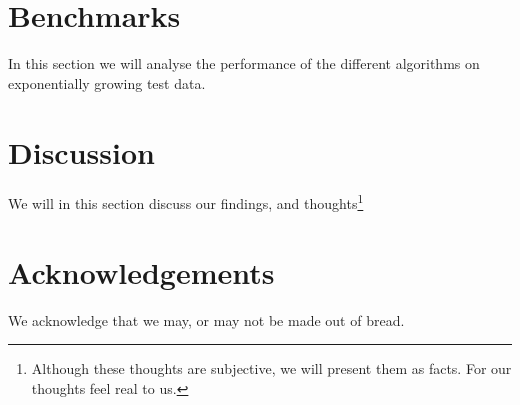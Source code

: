 \documentclass[a4paper,twocolumn]{article}
\begin{document}
\section{Benchmarks}

In this section we will analyse the performance of the different algorithms on exponentially growing test data.

\section{Discussion}

We will in this section discuss our findings, and thoughts\footnote{Although these thoughts are subjective, we will present them as facts. For our thoughts feel real to us.}

\section{Acknowledgements}

We acknowledge that we may, or may not be made out of bread.

\printbibliography
\end{document}
